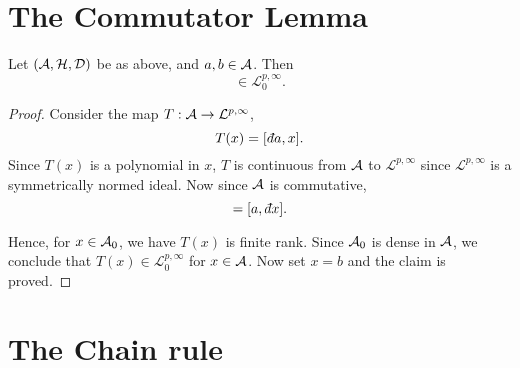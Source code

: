 \section{The Commutator Lemma}
\begin{lemma}
\label{commutator}
    Let $(\mathcal{A},\mathcal{H},\mathcal{D})$ be as above, and $a,b \in \mathcal{A}$. Then
    \begin{equation*}
        [\qd a,b] \in \mathcal{L}^{p,\infty}_0.
    \end{equation*}
\end{lemma}
\begin{proof}
    Consider the map $T:\mathcal{A}\to\mathcal{L}^{p,\infty}$,
    \begin{equation*}
        T(x) = [\qd a,x].
    \end{equation*}
    Since $T(x)$
    is a polynomial in $x$, $T$ is continuous from $\mathcal{A}$ to $\mathcal{L}^{p,\infty}$
    since $\mathcal{L}^{p,\infty}$ is a symmetrically normed ideal. Now since
    $\mathcal{A}$ is commutative,
    \begin{equation*}
        [\qd a,x] = [a,\qd x].
    \end{equation*}
    
    Hence, for $x \in \mathcal{A}_0$, we have $T(x)$ is finite rank. Since $\mathcal{A}_0$
    is dense in $\mathcal{A}$, we conclude that $T(x) \in \mathcal{L}^{p,\infty}_0$
    for $x \in \mathcal{A}$. Now set $x = b$ and the claim is proved.
\end{proof}

\section{The Chain rule}

